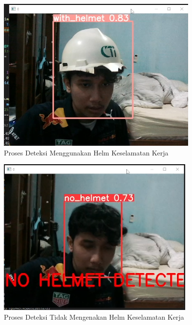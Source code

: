 \begin{figure}[ht]
  \centering
  \includegraphics[scale=1]{gambar/Screenshot_90.png}
  \caption{Proses Deteksi Menggunakan Helm Keselamatan Kerja}
  \label{fig:deteksiwthhelm}  
\end{figure}

\begin{figure}[ht]
  \centering
  \includegraphics[scale=1]{gambar/Screenshot_91.png}
  \caption{Proses Deteksi Tidak Mengenakan Helm Keselamatan Kerja}
  \label{fig:deteksinohelm}  
\end{figure}






% 

